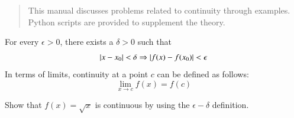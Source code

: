 \documentclass[journal,12pt,twocolumn]{IEEEtran}
\begin{document}
%
\IEEEpeerreviewmaketitle

\bigskip

\begin{abstract}
This manual discusses problems related to continuity through examples.  Python scripts are provided to supplement the theory.
\end{abstract}
%
\begin{definition}
\label{def:continutiy}
For every $\epsilon > 0$, there exists a $\delta > 0$ such that 
\begin{equation}
\left\vert x-x_0\right\vert < \delta \Rightarrow \left\vert f(x)-f(x_0)\right\vert < \epsilon
\end{equation}
In terms of limits, continuity at a point $c$ can be defined as follows:
\begin{equation}
\lim_{x \to c} f(x)=f(c)
\end{equation}
\end{definition}
\begin{problem}
Show that $f(x) = \sqrt{x}$  is continuous by using the $\epsilon - \delta$ definition.
\end{problem}
%
\end{document}

